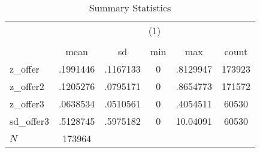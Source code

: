 \begin{table}[htbp]\centering
\def\sym#1{\ifmmode^{#1}\else\(^{#1}\)\fi}
\caption{Summary Statistics}
\begin{tabular}{l*{1}{ccccc}}
\hline\hline
            &\multicolumn{5}{c}{(1)}                                         \\
            &\multicolumn{5}{c}{}                                            \\
            &        mean&          sd&         min&         max&       count\\
\hline
z\_offer     &    .1991446&    .1167133&           0&    .8129947&      173923\\
z\_offer2    &    .1205276&    .0795171&           0&    .8654773&      171572\\
z\_offer3    &    .0638534&    .0510561&           0&    .4054511&       60530\\
sd\_offer3   &    .5128745&    .5975182&           0&    10.04091&       60530\\
\hline
\(N\)       &      173964&            &            &            &            \\
\hline\hline
\end{tabular}
\end{table}
